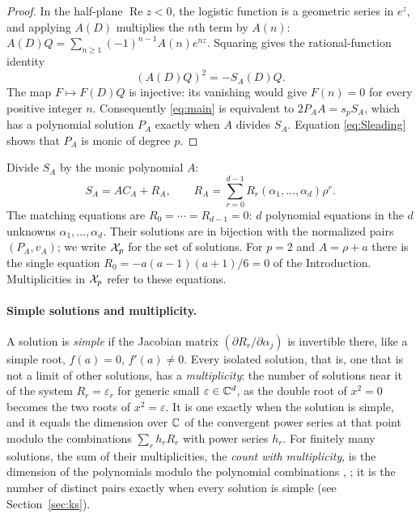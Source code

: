 \begin{proof}
In the half-plane \(\operatorname{Re}z<0\), the logistic function is a
geometric series in \(e^z\), and applying \(A(D)\) multiplies the
\(n\)th term by \(A(n)\): \(A(D)Q=\sum_{n\ge1}(-1)^{n-1}A(n)e^{nz}\).
Squaring gives the rational-function identity
\begin{equation}\label{eq:discrete-square}
 (A(D)Q)^2=-S_A(D)Q.
\end{equation}
The map \(F\mapsto F(D)Q\) is injective: its vanishing would give
\(F(n)=0\) for every positive integer \(n\). Consequently
\eqref{eq:main} is equivalent to \(2P_AA=s_pS_A\), which has a
polynomial solution \(P_A\) exactly when \(A\) divides \(S_A\). Equation
\eqref{eq:Sleading} shows that \(P_A\) is monic of degree \(p\).
\end{proof}

Divide \(S_A\) by the monic polynomial \(A\):
\begin{equation}\label{eq:remainder}
 S_A=AC_A+R_A,\qquad
 R_A=\sum_{r=0}^{d-1}R_r(\alpha_1,\ldots,\alpha_d)\rho^r.
\end{equation}
The matching equations are \(R_0=\cdots=R_{d-1}=0\): \(d\) polynomial
equations in the \(d\) unknowns \(\alpha_1,\ldots,\alpha_d\). Their
solutions are in bijection with the normalized pairs \((P_A,v_A)\); we
write \(\mathcal X_p\) for the set of solutions. For \(p=2\) and \(A=\rho+a\)
there is the single equation \(R_0=-a(a-1)(a+1)/6=0\) of the
Introduction. Multiplicities in \(\mathcal X_p\) refer to these equations.

\paragraph{Simple solutions and multiplicity.}
A solution is \emph{simple} if the Jacobian matrix
\((\partial R_r/\partial\alpha_j)\) is invertible there, like a simple
root, \(f(a)=0\), \(f'(a)\ne0\). Every isolated solution, that is, one
that is not a limit of other solutions, has a \emph{multiplicity}: the
number of solutions near it of the system \(R_r=\varepsilon_r\) for
generic small \(\varepsilon\in\mathbb C^d\), as the double root of \(x^2=0\)
becomes the two roots of \(x^2=\varepsilon\). It is one exactly when the
solution is simple, and it equals the dimension over \(\mathbb C\) of the
convergent power series at that point modulo the combinations
\(\sum_rh_rR_r\) with power series \(h_r\). For finitely many solutions,
the sum of their multiplicities, the \emph{count with multiplicity}, is
the dimension of the polynomials modulo the polynomial combinations
\citep[Sections~4.3 and~5.2]{ArnoldGuseinZadeVarchenko1985},
\citep[Chapter~4, \S2]{CoxLittleOShea2005}; it is the number of distinct
pairs exactly when every solution is simple (see Section~\ref{sec:ks}).

